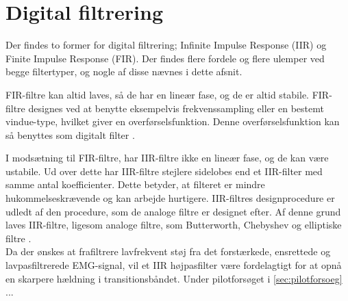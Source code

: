 \section{Digital filtrering}

Der findes to former for digital filtrering; Infinite Impulse Response (IIR) og Finite Impulse Response (FIR). Der findes flere fordele og flere ulemper ved begge filtertyper, og nogle af disse nævnes i dette afsnit\citep{blandford2012}.

FIR-filtre kan altid laves, så de har en lineær fase, og de er altid stabile. FIR-filtre designes ved at benytte eksempelvis frekvenssampling eller en bestemt vindue-type, hvilket giver en overførselsfunktion. Denne overførselsfunktion kan så benyttes som digitalt filter \citep{blandford2012}. 

I modsætning til FIR-filtre, har IIR-filtre ikke en lineær fase, og de kan være ustabile. Ud over dette har IIR-filtre stejlere sidelobes end et IIR-filter med samme antal koefficienter. Dette betyder, at filteret er mindre hukommelseskrævende og kan arbejde hurtigere. IIR-filtres designprocedure er udledt af den procedure, som de analoge filtre er designet efter. Af denne grund laves IIR-filtre, ligesom analoge filtre, som Butterworth, Chebyshev og elliptiske filtre \citep{blandford2012}. 
\\

Da der ønskes at frafiltrere lavfrekvent støj fra det forstærkede, ensrettede og lavpasfiltrerede EMG-signal, vil et IIR højpasfilter være fordelagtigt for at opnå en skarpere hældning i transitionsbåndet. Under pilotforsøget i \autoref{sec:pilotforsoeg} ...
